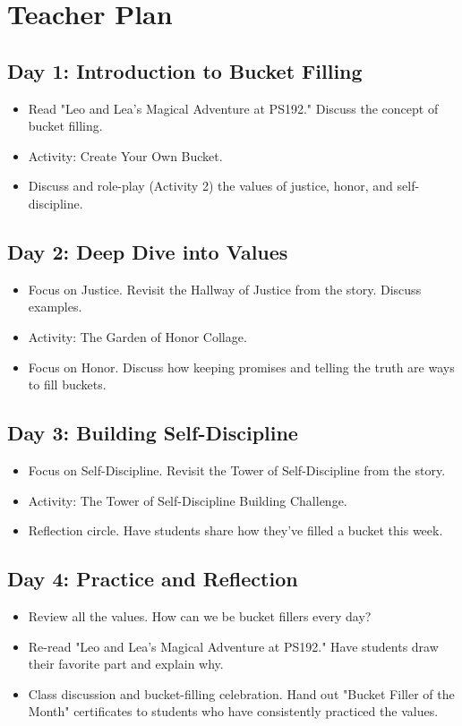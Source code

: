 \documentclass[11pt]{article}
\begin{document}
\section{Teacher Plan}
\label{sec:orgdaaa5f3}
\subsection{Day 1: Introduction to Bucket Filling}
\label{sec:org844715f}
\begin{itemize}
\item Read "Leo and Lea's Magical Adventure at PS192." Discuss the concept of bucket filling.
\item Activity: Create Your Own Bucket.
\item Discuss and role-play (Activity 2) the values of justice, honor, and self-discipline.
\end{itemize}

\subsection{Day 2: Deep Dive into Values}
\label{sec:org73404ac}
\begin{itemize}
\item Focus on Justice. Revisit the Hallway of Justice from the story. Discuss examples.
\item Activity: The Garden of Honor Collage.
\item Focus on Honor. Discuss how keeping promises and telling the truth are ways to fill buckets.
\end{itemize}

\subsection{Day 3: Building Self-Discipline}
\label{sec:org731e2f6}
\begin{itemize}
\item Focus on Self-Discipline. Revisit the Tower of Self-Discipline from the story.
\item Activity: The Tower of Self-Discipline Building Challenge.
\item Reflection circle. Have students share how they’ve filled a bucket this week.
\end{itemize}

\subsection{Day 4: Practice and Reflection}
\label{sec:orgf182080}
\begin{itemize}
\item Review all the values. How can we be bucket fillers every day?
\item Re-read "Leo and Lea's Magical Adventure at PS192." Have students draw their favorite part and explain why.
\item Class discussion and bucket-filling celebration. Hand out "Bucket Filler of the Month" certificates to students who have consistently practiced the values.
\end{itemize}
\newpage
\end{document}
